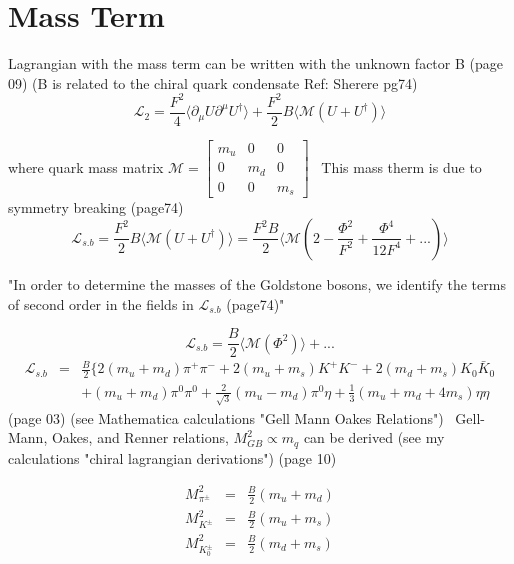\documentclass{article}
\begin{document}
\newpage
\section{Mass Term}
Lagrangian with the mass term can be written with the unknown factor B \cite{kubis2007introduction} (page 09) (B is related to the chiral quark condensate Ref: Sherere pg74)
$$\mathcal L_{2}=\frac{F^{2}}{4} \Big \langle \partial_{\mu} U \partial^{\mu} U^{\dag} \Big \rangle 
+\frac{F^{2}}{2} B \Big \langle \mathcal M \left( U + U^{\dag} \right) \Big \rangle$$

where quark mass matrix $ \mathcal M =  \left[ \begin{array}{ccc}
	m_{u} & 0 & 0 \\
	0 & m_{d} & 0\\
	0 & 0 & m_{s} \end{array} \right] $
\
This mass therm is due to symmetry breaking \cite{scherer2003introduction} (page74)
$$	\mathcal L_{s.b} =\frac{F^{2}}{2} B \Big \langle \mathcal M \left( U + U^{\dag} \right) \Big \rangle =
 \frac{F^{2}B}{2} \Big \langle \mathcal M \left( 2- \frac{\Phi^{2}}{F^{2}} + \frac{\Phi^{4}}{12F^{4}}+...\right) \Big \rangle $$
 
"In order to determine the masses of the Goldstone bosons, we identify the terms of second order in the fields in $	\mathcal L_{s.b}$ \cite{scherer2003introduction} (page74)" 
 
$$	\mathcal L_{s.b} = \frac{B}{2} \Big \langle \mathcal M \left( \Phi^{2}\right) \Big \rangle +... $$
\begin{eqnarray*}
	\mathcal L_{s.b} & = & 
	\frac{B}{2} \{ 2(m_{u}+m_{d}) \pi^{+}\pi^{-} + 2(m_{u}+m_{s}) K^{+}K^{-} + 2(m_{d}+m_{s})K_{0}\bar{K}_{0} \\& & 
	+ (m_{u}+m_{d}) \pi^{0}\pi^{0} +\frac{2}{\sqrt{3}}(m_{u}-m_{d}) \pi^{0} \eta  +\frac{1}{3}(m_{u}+m_{d}+4m_{s}) \eta\eta
\end{eqnarray*}
\cite{scherer2003introduction} (page 03) (see Mathematica calculations "Gell Mann Oakes Relations")
\
Gell-Mann, Oakes, and Renner relations, $ M^{2}_{GB} \propto m_{q}  $ can be derived (see my calculations "chiral lagrangian derivations")\cite{kubis2007introduction} (page 10)

\begin{eqnarray*}
	M^{2}_{\pi^{\pm}} & = &  \frac{B}{2} (m_{u}+m_{d}) \\
	M^{2}_{K^{\pm}} & = &  \frac{B}{2} (m_{u}+m_{s}) \\
	M^{2}_{K_{0}^{\pm}} & = &  \frac{B}{2} (m_{d}+m_{s}) \\
\end{eqnarray*}
\end{document}
